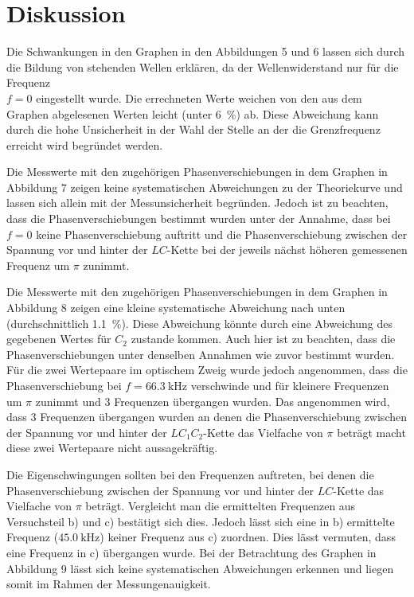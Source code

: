 
\section{Diskussion}
\label{sec:Diskussion}

Die Schwankungen in den Graphen in den Abbildungen 5 und 6 lassen sich durch die Bildung von stehenden Wellen erklären, da der Wellenwiderstand nur für die Frequenz \\$f=0$ eingestellt wurde. Die errechneten Werte weichen von den aus dem Graphen abgelesenen Werten leicht (unter \SI{6}{\percent}) ab. Diese Abweichung kann durch die hohe Unsicherheit in der Wahl der Stelle an der die Grenzfrequenz erreicht wird begründet werden. 

Die Messwerte mit den zugehörigen Phasenverschiebungen in dem Graphen in Abbildung 7 zeigen keine systematischen Abweichungen zu der Theoriekurve und lassen sich allein mit der Messunsicherheit begründen. Jedoch ist zu beachten, dass die Phasenverschiebungen bestimmt wurden unter der Annahme, dass bei $f=0$ keine Phasenverschiebung auftritt und die Phasenverschiebung zwischen der Spannung vor und hinter der $LC$-Kette bei der jeweils nächst höheren gemessenen Frequenz um $\pi$ zunimmt.

Die Messwerte mit den zugehörigen Phasenverschiebungen in dem Graphen in Abbildung 8 zeigen eine kleine systematische Abweichung nach unten (durchschnittlich \SI{1.1}{\percent}). Diese Abweichung könnte durch eine Abweichung des gegebenen Wertes für $C_2$ zustande kommen. Auch hier ist zu beachten, dass die Phasenverschiebungen unter denselben Annahmen wie zuvor bestimmt wurden. Für die zwei Wertepaare im optischem Zweig wurde jedoch angenommen, dass die Phasenverschiebung bei $f=\SI{66.3}{\kilo\hertz}$ verschwinde und für kleinere Frequenzen um $\pi$ zunimmt und 3 Frequenzen übergangen wurden. Das angenommen wird, dass 3 Frequenzen übergangen wurden an denen die Phasenverschiebung zwischen der Spannung vor und hinter der $LC_1C_2$-Kette das Vielfache von $\pi$ beträgt macht diese zwei Wertepaare nicht aussagekräftig.

Die Eigenschwingungen sollten bei den Frequenzen auftreten, bei denen die Phasenverschiebung zwischen der Spannung vor und hinter der $LC$-Kette das Vielfache von $\pi$ beträgt. Vergleicht man die ermittelten Frequenzen aus Versuchsteil b) und c) bestätigt sich dies. Jedoch lässt sich eine in b) ermittelte Frequenz ($\SI{45.0}{\kilo\hertz}$) keiner Frequenz aus c) zuordnen. Dies lässt vermuten, dass eine Frequenz in c) übergangen wurde.
Bei der Betrachtung des Graphen in Abbildung 9 lässt sich keine systematischen Abweichungen erkennen und liegen somit im Rahmen der Messungenauigkeit.

